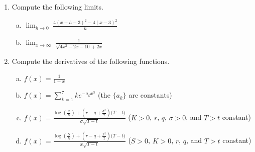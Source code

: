 \documentclass[letterpaper,12pt]{article}
\begin{document}
\begin{enumerate}
\item Compute the following limits.

\vspace{0.5em}

\begin{enumerate}[(a)]
\item $\displaystyle \lim_{h \rightarrow 0} \; \frac{4 (x + h - 3)^{2} - 4 (x - 3)^{2}}{h}$

\vspace{0.5em}

\item $\displaystyle \lim_{x \rightarrow \infty} \; \frac{1}{\sqrt{4x^2 - 2x - 10} + 2x}$
\end{enumerate}

\vspace{1em}


\item Compute the derivatives of the following functions.

\vspace{0.5em}

\begin{enumerate}[(a)]
\item $\displaystyle f(x) = \frac{1}{1 - x}$ 

\vspace{0.5em}

\item $\displaystyle f(x) = \sum_{k = 1}^{7} k e^{-a_{k} x^{3}}$ \hspace{1em} (the $\{a_{k}\}$ are constants)

\vspace{0.5em}

\item $\displaystyle f(x) = \frac{\log\left(\frac{x}{K}\right) + \left(r - q + \frac{\sigma^{2}}{2} \right) \big( T - t \big)}{\sigma \sqrt{T - t}}$ \hspace{1em} ($K > 0$, $r$, $q$, $\sigma > 0$, and $T > t$ constant)

\vspace{0.5em}

\item $\displaystyle f(x) = \frac{\log\left(\frac{S}{K}\right) + \left(r - q + \frac{x^{2}}{2} \right) \big( T - t \big)}{x \sqrt{T - t}}$ \hspace{1em} ($S > 0$, $K > 0$, $r$, $q$, and $T > t$ constant)

\vspace{0.5em}


\end{enumerate}
\end{enumerate}
\end{document}
